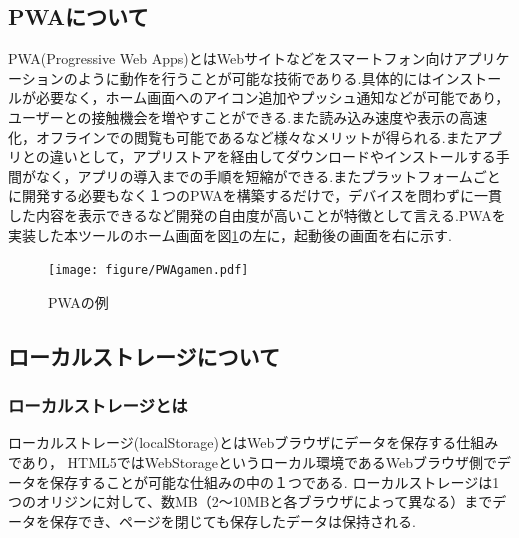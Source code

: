 \documentclass[a4j,12pt]{jarticle}
\begin{document}
\subsection{PWAについて}
PWA(Progressive Web Apps)とはWebサイトなどをスマートフォン向けアプリケーションのように動作を行うことが可能な技術でありる.具体的にはインストールが必要なく，ホーム画面へのアイコン追加やプッシュ通知などが可能であり，ユーザーとの接触機会を増やすことができる.また読み込み速度や表示の高速化，オフラインでの閲覧も可能であるなど様々なメリットが得られる.またアプリとの違いとして，アプリストアを経由してダウンロードやインストールする手間がなく，アプリの導入までの手順を短縮ができる.またプラットフォームごとに開発する必要もなく１つのPWAを構築するだけで，デバイスを問わずに一貫した内容を表示できるなど開発の自由度が高いことが特徴として言える\cite{ren6}.PWAを実装した本ツールのホーム画面を図\ref{fig:f}の左に，起動後の画面を右に示す.
\begin{figure}[h]
\begin{center}
 \texttt{[image: figure/PWAgamen.pdf]}
\end{center}
 \caption{PWAの例}
 \label{fig:f}
\end{figure}
\newpage

\subsection{ローカルストレージについて}
\subsubsection{ローカルストレージとは}
ローカルストレージ(localStorage)とはWebブラウザにデータを保存する仕組みであり， HTML5ではWebStorageというローカル環境であるWebブラウザ側でデータを保存することが可能な仕組みの中の１つである. ローカルストレージは1つのオリジンに対して、数MB（2〜10MBと各ブラウザによって異なる）までデータを保存でき、ページを閉じても保存したデータは保持される.
\end{document}
